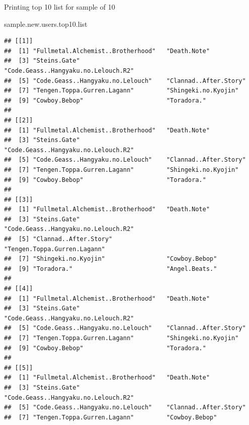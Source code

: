 \documentclass[
  ignorenonframetext,
]{beamer}
\newenvironment{Shaded}{\begin{snugshade}}{\end{snugshade}}
\newcommand{\NormalTok}[1]{#1}
\begin{document}
\begin{frame}[fragile]{Printing top 10 list for sample of 10}
\protect\hypertarget{printing-top-10-list-for-sample-of-10}{}

\begin{Shaded}
\begin{Highlighting}[]
\NormalTok{sample.new.users.top10.list}
\end{Highlighting}
\end{Shaded}

\begin{verbatim}
## [[1]]
##  [1] "Fullmetal.Alchemist..Brotherhood"   "Death.Note"                        
##  [3] "Steins.Gate"                        "Code.Geass..Hangyaku.no.Lelouch.R2"
##  [5] "Code.Geass..Hangyaku.no.Lelouch"    "Clannad..After.Story"              
##  [7] "Tengen.Toppa.Gurren.Lagann"         "Shingeki.no.Kyojin"                
##  [9] "Cowboy.Bebop"                       "Toradora."                         
## 
## [[2]]
##  [1] "Fullmetal.Alchemist..Brotherhood"   "Death.Note"                        
##  [3] "Steins.Gate"                        "Code.Geass..Hangyaku.no.Lelouch.R2"
##  [5] "Code.Geass..Hangyaku.no.Lelouch"    "Clannad..After.Story"              
##  [7] "Tengen.Toppa.Gurren.Lagann"         "Shingeki.no.Kyojin"                
##  [9] "Cowboy.Bebop"                       "Toradora."                         
## 
## [[3]]
##  [1] "Fullmetal.Alchemist..Brotherhood"   "Death.Note"                        
##  [3] "Steins.Gate"                        "Code.Geass..Hangyaku.no.Lelouch.R2"
##  [5] "Clannad..After.Story"               "Tengen.Toppa.Gurren.Lagann"        
##  [7] "Shingeki.no.Kyojin"                 "Cowboy.Bebop"                      
##  [9] "Toradora."                          "Angel.Beats."                      
## 
## [[4]]
##  [1] "Fullmetal.Alchemist..Brotherhood"   "Death.Note"                        
##  [3] "Steins.Gate"                        "Code.Geass..Hangyaku.no.Lelouch.R2"
##  [5] "Code.Geass..Hangyaku.no.Lelouch"    "Clannad..After.Story"              
##  [7] "Tengen.Toppa.Gurren.Lagann"         "Shingeki.no.Kyojin"                
##  [9] "Cowboy.Bebop"                       "Toradora."                         
## 
## [[5]]
##  [1] "Fullmetal.Alchemist..Brotherhood"   "Death.Note"                        
##  [3] "Steins.Gate"                        "Code.Geass..Hangyaku.no.Lelouch.R2"
##  [5] "Code.Geass..Hangyaku.no.Lelouch"    "Clannad..After.Story"              
##  [7] "Tengen.Toppa.Gurren.Lagann"         "Cowboy.Bebop"                      

\end{verbatim}
\end{frame}
\end{document}
